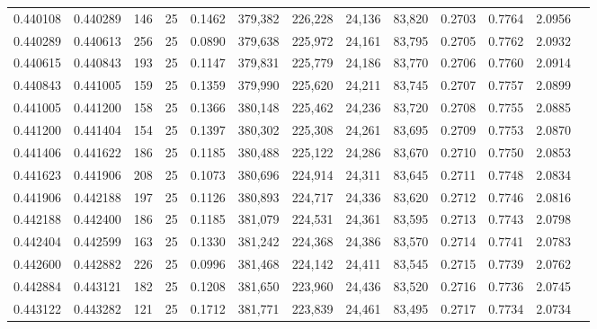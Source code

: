\begin{tabular}{rrrrrrrrrrrrr}
0.440108 & 0.440289 &   146 &  25 &                                     0.1462 & 379,382 & 226,228 &  24,136 &  83,820 & 0.2703 & 0.7764 & 2.0956 \\
0.440289 & 0.440613 &   256 &  25 &                                     0.0890 & 379,638 & 225,972 &  24,161 &  83,795 & 0.2705 & 0.7762 & 2.0932 \\
0.440615 & 0.440843 &   193 &  25 &                                     0.1147 & 379,831 & 225,779 &  24,186 &  83,770 & 0.2706 & 0.7760 & 2.0914 \\
0.440843 & 0.441005 &   159 &  25 &                                     0.1359 & 379,990 & 225,620 &  24,211 &  83,745 & 0.2707 & 0.7757 & 2.0899 \\
0.441005 & 0.441200 &   158 &  25 &                                     0.1366 & 380,148 & 225,462 &  24,236 &  83,720 & 0.2708 & 0.7755 & 2.0885 \\
0.441200 & 0.441404 &   154 &  25 &                                     0.1397 & 380,302 & 225,308 &  24,261 &  83,695 & 0.2709 & 0.7753 & 2.0870 \\
0.441406 & 0.441622 &   186 &  25 &                                     0.1185 & 380,488 & 225,122 &  24,286 &  83,670 & 0.2710 & 0.7750 & 2.0853 \\
0.441623 & 0.441906 &   208 &  25 &                                     0.1073 & 380,696 & 224,914 &  24,311 &  83,645 & 0.2711 & 0.7748 & 2.0834 \\
0.441906 & 0.442188 &   197 &  25 &                                     0.1126 & 380,893 & 224,717 &  24,336 &  83,620 & 0.2712 & 0.7746 & 2.0816 \\
0.442188 & 0.442400 &   186 &  25 &                                     0.1185 & 381,079 & 224,531 &  24,361 &  83,595 & 0.2713 & 0.7743 & 2.0798 \\
0.442404 & 0.442599 &   163 &  25 &                                     0.1330 & 381,242 & 224,368 &  24,386 &  83,570 & 0.2714 & 0.7741 & 2.0783 \\
0.442600 & 0.442882 &   226 &  25 &                                     0.0996 & 381,468 & 224,142 &  24,411 &  83,545 & 0.2715 & 0.7739 & 2.0762 \\
0.442884 & 0.443121 &   182 &  25 &                                     0.1208 & 381,650 & 223,960 &  24,436 &  83,520 & 0.2716 & 0.7736 & 2.0745 \\
0.443122 & 0.443282 &   121 &  25 &                                     0.1712 & 381,771 & 223,839 &  24,461 &  83,495 & 0.2717 & 0.7734 & 2.0734 \\

\end{tabular}

